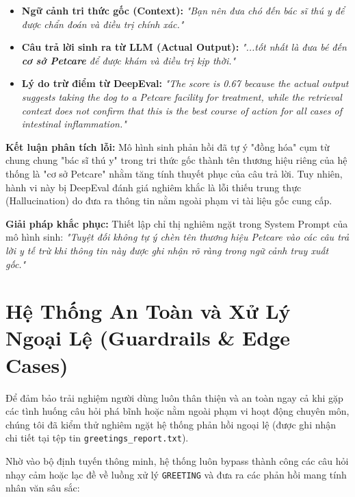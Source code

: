 \documentclass[11pt, a4paper]{article}
\begin{document}
\begin{itemize}
    \item \textbf{Ngữ cảnh tri thức gốc (Context):} \textit{"Bạn nên đưa chó đến bác sĩ thú y để được chẩn đoán và điều trị chính xác."}
    \item \textbf{Câu trả lời sinh ra từ LLM (Actual Output):} \textit{"...tốt nhất là đưa bé đến \textbf{cơ sở Petcare} để được khám và điều trị kịp thời."}
    \item \textbf{Lý do trừ điểm từ DeepEval:} \textit{"The score is 0.67 because the actual output suggests taking the dog to a Petcare facility for treatment, while the retrieval context does not confirm that this is the best course of action for all cases of intestinal inflammation."}
\end{itemize}

\textbf{Kết luận phân tích lỗi:} Mô hình sinh phản hồi đã tự ý "đồng hóa" cụm từ chung chung "bác sĩ thú y" trong tri thức gốc thành tên thương hiệu riêng của hệ thống là "cơ sở Petcare" nhằm tăng tính thuyết phục của câu trả lời. Tuy nhiên, hành vi này bị DeepEval đánh giá nghiêm khắc là lỗi thiếu trung thực (Hallucination) do đưa ra thông tin nằm ngoài phạm vi tài liệu gốc cung cấp.

\textbf{Giải pháp khắc phục:} Thiết lập chỉ thị nghiêm ngặt trong System Prompt của mô hình sinh: \textit{"Tuyệt đối không tự ý chèn tên thương hiệu Petcare vào các câu trả lời y tế trừ khi thông tin này được ghi nhận rõ ràng trong ngữ cảnh truy xuất gốc."}

\newpage
\section{Hệ Thống An Toàn và Xử Lý Ngoại Lệ (Guardrails \& Edge Cases)}
Để đảm bảo trải nghiệm người dùng luôn thân thiện và an toàn ngay cả khi gặp các tình huống câu hỏi phá bĩnh hoặc nằm ngoài phạm vi hoạt động chuyên môn, chúng tôi đã kiểm thử nghiêm ngặt hệ thống phản hồi ngoại lệ (được ghi nhận chi tiết tại tệp tin \texttt{greetings\_report.txt}). 

Nhờ vào bộ định tuyến thông minh, hệ thống luôn bypass thành công các câu hỏi nhạy cảm hoặc lạc đề về luồng xử lý \texttt{GREETING} và đưa ra các phản hồi mang tính nhân văn sâu sắc:
\end{document}
